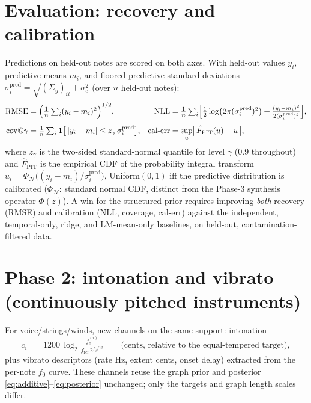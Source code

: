 \documentclass[11pt,a4paper]{report}
\newcommand{\N}{\mathcal{N}}
\newcommand{\Sy}{\Sigma_y}             %
\begin{document}
\section{Evaluation: recovery and calibration}
Predictions on held-out notes are scored on both axes. With held-out values $y_i$,
predictive means $m_i$, and floored predictive standard deviations
$\sigma_i^{\mathrm{pred}} = \sqrt{(\Sy)_{ii} + \sigma_e^2}$ (over $n$ held-out
notes):
\begin{align}
  \text{RMSE} &= \Bigl( \tfrac1n \textstyle\sum_i (y_i - m_i)^2 \Bigr)^{1/2},
  &
  \text{NLL} &= \tfrac1n \textstyle\sum_i \Bigl[ \tfrac12 \log\bigl(2\pi (\sigma_i^{\mathrm{pred}})^2\bigr)
        + \tfrac{(y_i - m_i)^2}{2 (\sigma_i^{\mathrm{pred}})^2} \Bigr],
  \\[3pt]
  \text{cov}@\gamma &= \tfrac1n \textstyle\sum_i \mathbf{1}\bigl[\, |y_i - m_i| \le z_{\gamma}\, \sigma_i^{\mathrm{pred}} \bigr],
  &
  \text{cal-err} &= \sup_u \bigl|\, \hat F_{\mathrm{PIT}}(u) - u \,\bigr|,
\end{align}
where $z_\gamma$ is the two-sided standard-normal quantile for level $\gamma$ (0.9
throughout) and $\hat F_{\mathrm{PIT}}$ is the empirical CDF of the probability
integral transform $u_i = \Phi_{\N}\bigl((y_i - m_i)/\sigma_i^{\mathrm{pred}}\bigr)$,
Uniform$(0,1)$ iff the predictive distribution is calibrated ($\Phi_{\N}$: standard
normal CDF, distinct from the Phase-3 synthesis operator $\Phi(z)$). A win for the
structured prior requires improving \emph{both} recovery (RMSE) and calibration
(NLL, coverage, cal-err) against the independent, temporal-only, ridge, and
LM-mean-only baselines, on held-out, contamination-filtered data.

\section{Phase 2: intonation and vibrato (continuously pitched instruments)}
For voice/strings/winds, new channels on the same support: intonation
\begin{equation}
  c_i \;=\; 1200 \, \log_2 \tfrac{f_0^{(i)}}{f_{\mathrm{ref}}\, 2^{\,p_i / 12}}
  \qquad \text{(cents, relative to the equal-tempered target)},
\end{equation}
plus vibrato descriptors (rate Hz, extent cents, onset delay) extracted from the
per-note $f_0$ curve. These channels reuse the graph prior and posterior
\eqref{eq:additive}--\eqref{eq:posterior} unchanged; only the targets and graph
length scales differ.
\end{document}
